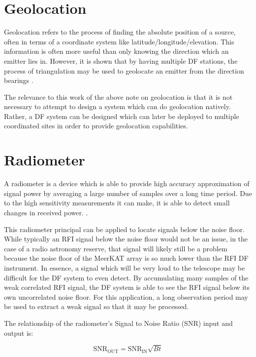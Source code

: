 \section{Geolocation}
Geolocation refers to the process of finding the absolute position of a source, often in terms of a coordinate system like latitude/longitude/elevation. This information is often more useful than only knowing the direction which an emitter lies in. However, it is shown that by having multiple DF stations, the process of triangulation may be used to geolocate an emitter from the direction bearings \cite{poisel2012electronic}. 

The relevance to this work of the above note on geolocation is that it is not necessary to attempt to design a system which can do geolocation natively. Rather, a DF system can be designed which can later be deployed to multiple coordinated sites in order to provide geolocation capabilities. 

\section{Radiometer}
A radiometer is a device which is able to provide high accuracy approximation of signal power by averaging a large number of samples over a long time period. Due to the high sensitivity measurements it can make, it is able to detect small changes in received power\cite{nraoradiometers}. \cite{casperradiometerequation}.

This radiometer principal can be applied to locate signals below the noise floor. While typically an RFI signal below the noise floor would not be an issue, in the case of a radio astronomy reserve, that signal will likely still be a problem because the noise floor of the MeerKAT array is so much lower than the RFI DF instrument. In essence, a signal which will be very loud to the telescope may be difficult for the DF system to even detect. By accumulating many samples of the weak correlated RFI signal, the DF system is able to see the RFI signal below its own uncorrelated noise floor. For this application, a long observation period may be used to extract a weak signal so that it may be processed.

The relationship of the radiometer's Signal to Noise Ratio (SNR) input and output is: \cite{casperradiometerequation}

\begin{equation}
  \text{SNR}_{\text{OUT}} = \text{SNR}_{\text{IN}}\sqrt{Bt}
\end{equation}

